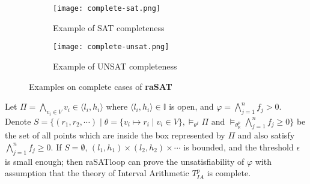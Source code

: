 \begin{figure}[ht]
\centering
\begin{subfigure}[b]{0.4\textwidth}
\texttt{[image: complete-sat.png]} 
\caption{Example of SAT completeness}
\label{fig:complete-sat}
\end{subfigure}
\begin{subfigure}[b]{0.4\textwidth}
\texttt{[image: complete-unsat.png]} 
\caption{Example of UNSAT completeness}
\label{fig:complete-unsat}
\end{subfigure}
\caption{Examples on complete cases of \textbf{raSAT}} 
\label{fig:complete-ex}
\end{figure}

\begin{theorem} \label{theorem:UNSAT-complete}
\sloppy
Let $\Pi = \bigwedge\limits_{v_i \in V} v_i \in \langle l_i, h_i \rangle$ where $\langle l_i, h_i \rangle \in \mathbb{I}$ is open, and ${\varphi = \bigwedge\limits_{j = 1}^n f_j > 0}$. Denote $S = \{(r_1, r_2, \cdots) \mid \theta = \{v_i \mapsto r_i \mid v_i \in V \}, \models_{\theta^I} \Pi \text{ and } \models_{\theta^p_\mathbb{R}}\bigwedge\limits_{j = 1}^n f_j \ge 0 \}$ be the set of all points which are inside the box represented by $\Pi$ and also satisfy $\bigwedge\limits_{j = 1}^n f_j \ge 0$. If $S = \emptyset$, $(l_1, h_1) \times (l_2, h_2) \times \cdots$ is bounded, and the threshold $\epsilon$ is small enough; then raSATloop can prove the unsatisfiability of $\varphi$ with assumption that the theory of Interval Arithmetic $T^p_{IA}$ is complete.
\end{theorem}


